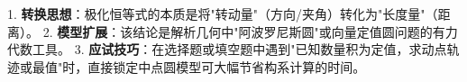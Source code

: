 \begin{summarybox}
1. \textbf{转换思想}：极化恒等式的本质是将"转动量"（方向/夹角）转化为"长度量"（距离）。
2. \textbf{模型扩展}：该结论是解析几何中"阿波罗尼斯圆"或向量定值圆问题的有力代数工具。
3. \textbf{应试技巧}：在选择题或填空题中遇到"已知数量积为定值，求动点轨迹或最值"时，直接锁定中点圆模型可大幅节省构系计算的时间。
\end{summarybox}